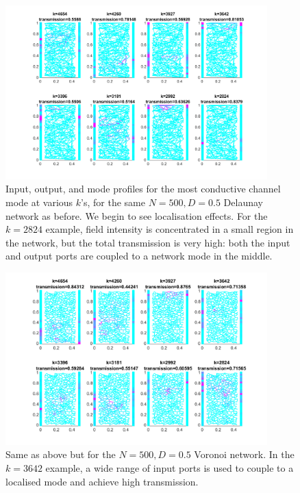 \begin{figure}[hbp]
  \centering
    \includegraphics[width=0.9\textwidth]{ch3/fig3/kmodes_N500D05d.png}
    \caption{Input, output, and mode profiles for the most conductive channel mode at various $k$'s, for the same $N=500, D=0.5$ Delaunay network as before. We begin to see localisation effects. For the $k=2824$ example, field intensity is concentrated in a small region in the network, but the total transmission is very high: both the input and output ports are coupled to a network mode in the middle.} 
    \label{fig:kmodes_N500D05d}
\end{figure}

\begin{figure}[htp]
  \centering
    \includegraphics[width=0.9\textwidth]{ch3/fig3/kmodes_N500D05v.png}
    \caption{Same as above but for the $N=500, D=0.5$ Voronoi network. In the $k=3642$ example, a wide range of input ports is used to couple to a localised mode and achieve high transmission.} 
    \label{fig:kmodes_N500D05v}
\end{figure}

